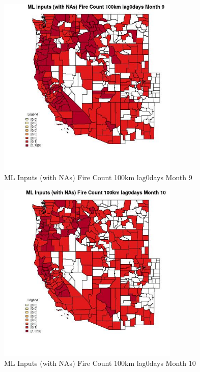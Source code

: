 \begin{figure} 
\centering  
\includegraphics[width=0.77\textwidth]{Code_Outputs/Report_ML_input_PM25_Step4_part_e_de_duplicated_aves_compiled_2019-05-21wNAs_CountyFire_Count_100km_lag0daysmedianMonth9.jpg} 
\caption{\label{fig:Report_ML_input_PM25_Step4_part_e_de_duplicated_aves_compiled_2019-05-21wNAsCountyFire_Count_100km_lag0daysmedianMonth9}ML Inputs (with NAs) Fire Count 100km lag0days Month 9} 
\end{figure} 
 

\begin{figure} 
\centering  
\includegraphics[width=0.77\textwidth]{Code_Outputs/Report_ML_input_PM25_Step4_part_e_de_duplicated_aves_compiled_2019-05-21wNAs_CountyFire_Count_100km_lag0daysmedianMonth10.jpg} 
\caption{\label{fig:Report_ML_input_PM25_Step4_part_e_de_duplicated_aves_compiled_2019-05-21wNAsCountyFire_Count_100km_lag0daysmedianMonth10}ML Inputs (with NAs) Fire Count 100km lag0days Month 10} 
\end{figure} 
 

